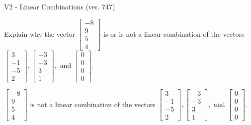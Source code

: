 \begin{exercise}
  \begin{exerciseTitle}V2 - Linear Combinations (ver. 747)\end{exerciseTitle}
  \begin{exerciseStatement}
    Explain why the vector \(\left[\begin{array}{c}
-8 \\
9 \\
5 \\
4
\end{array}\right]\)  is or is not a linear 
	combination of the vectors \(\left[\begin{array}{c}
3 \\
-1 \\
-5 \\
2
\end{array}\right] , \left[\begin{array}{c}
-3 \\
-3 \\
3 \\
1
\end{array}\right] , \text{ and } \left[\begin{array}{c}
0 \\
0 \\
0 \\
0
\end{array}\right]\).
	


  \end{exerciseStatement}
  \begin{exerciseAnswer}
   \(\left[\begin{array}{c}
-8 \\
9 \\
5 \\
4
\end{array}\right]\) 
  	 is not  
	a linear combination of the vectors \(\left[\begin{array}{c}
3 \\
-1 \\
-5 \\
2
\end{array}\right] , \left[\begin{array}{c}
-3 \\
-3 \\
3 \\
1
\end{array}\right] , \text{ and } \left[\begin{array}{c}
0 \\
0 \\
0 \\
0
\end{array}\right]\).

	
  


  \end{exerciseAnswer}
\end{exercise}